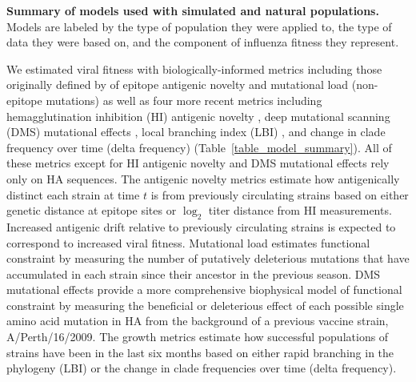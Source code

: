 \begin{table}
  \begin{center}
    \scalebox{0.67}{
      
    }
    \caption[{Summary of models used with simulated and natural populations.}]{
      {\bf Summary of models used with simulated and natural populations.}
      Models are labeled by the type of population they were applied to, the type of data they were based on, and the component of influenza fitness they represent.
    }
    \label{table_model_summary}
  \end{center}
\end{table}

We estimated viral fitness with biologically-informed metrics including those originally defined by \cite{Luksza:2014hj} of epitope antigenic novelty and mutational load (non-epitope mutations) as well as four more recent metrics including hemagglutination inhibition (HI) antigenic novelty \citep{Neher:2016hy}, deep mutational scanning (DMS) mutational effects \citep{Lee2018}, local branching index (LBI) \citep{Neher:2014eu}, and change in clade frequency over time (delta frequency) (Table~\ref{table_model_summary}).
All of these metrics except for HI antigenic novelty and DMS mutational effects rely only on HA sequences.
The antigenic novelty metrics estimate how antigenically distinct each strain at time $t$ is from previously circulating strains based on either genetic distance at epitope sites or $\log_{2}$ titer distance from HI measurements.
Increased antigenic drift relative to previously circulating strains is expected to correspond to increased viral fitness.
Mutational load estimates functional constraint by measuring the number of putatively deleterious mutations that have accumulated in each strain since their ancestor in the previous season.
DMS mutational effects provide a more comprehensive biophysical model of functional constraint by measuring the beneficial or deleterious effect of each possible single amino acid mutation in HA from the background of a previous vaccine strain, A/Perth/16/2009.
The growth metrics estimate how successful populations of strains have been in the last six months based on either rapid branching in the phylogeny (LBI) or the change in clade frequencies over time (delta frequency).

